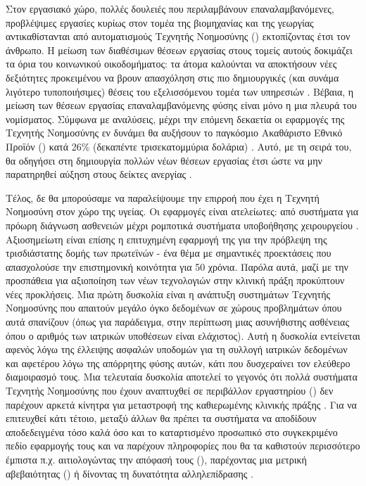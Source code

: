 Στον εργασιακό χώρο, πολλές δουλειές που περιλαμβάνουν επαναλαμβανόμενες, προβλέψιμες εργασίες κυρίως στον τομέα της βιομηχανίας και της γεωργίας αντικαθίστανται από αυτοματισμούς Τεχνητής Νοημοσύνης () εκτοπίζοντας έτσι τον άνθρωπο. 
Η μείωση των διαθέσιμων θέσεων εργασίας στους τομείς αυτούς δοκιμάζει τα όρια του κοινωνικού οικοδομήματος: τα  άτομα καλούνται να αποκτήσουν νέες δεξιότητες προκειμένου να βρουν απασχόληση στις πιο δημιουργικές (και συνάμα λιγότερο τυποποιήσιμες) θέσεις του εξελισσόμενου τομέα των υπηρεσιών \cite{makridakis2017forthcoming}. Βέβαια, η μείωση των θέσεων εργασίας επαναλαμβανόμενης φύσης είναι μόνο η μια πλευρά του νομίσματος. Σύμφωνα με αναλύσεις, μέχρι την επόμενη δεκαετία οι εφαρμογές της Τεχνητής Νοημοσύνης εν δυνάμει θα αυξήσουν το παγκόσμιο Ακαθάριστο Εθνικό Προϊόν () κατά 26\% (δεκαπέντε τρισεκατομμύρια δολάρια) \cite{hawksworth2018will}. Αυτό, με τη σειρά του, θα οδηγήσει στη δημιουργία πολλών νέων θέσεων εργασίας έτσι ώστε να μην παρατηρηθεί αύξηση στους δείκτες ανεργίας \cite{hawksworth2018will,world2020future}.
\par

Τέλος, δε θα μπορούσαμε να παραλείψουμε την επιρροή που έχει η Τεχνητή Νοημοσύνη στον χώρο της υγείας. Οι εφαρμογές είναι ατελείωτες: από συστήματα για πρόωρη διάγνωση ασθενειών μέχρι ρομποτικά συστήματα υποβοήθησης χειρουργείου \cite{tai2020impact}. Αξιοσημείωτη είναι επίσης η επιτυχημένη εφαρμογή της για την πρόβλεψη της τρισδιάστατης δομής των πρωτεϊνών \cite{senior2020improved} - ένα θέμα με σημαντικές προεκτάσεις που απασχολούσε την επιστημονική κοινότητα για 50 χρόνια. Παρόλα αυτά, μαζί με την προσπάθεια για αξιοποίηση των νέων τεχνολογιών στην κλινική πράξη προκύπτουν νέες προκλήσεις. Μια πρώτη δυσκολία είναι η ανάπτυξη συστημάτων Τεχνητής Νοημοσύνης που απαιτούν μεγάλο όγκο δεδομένων σε χώρους προβλημάτων όπου αυτά σπανίζουν (όπως για παράδειγμα, στην περίπτωση μιας ασυνήθιστης ασθένειας όπου ο αριθμός των ιατρικών υποθέσεων είναι ελάχιστος). Αυτή η δυσκολία εντείνεται αφενός λόγω της έλλειψης ασφαλών υποδομών για τη συλλογή ιατρικών δεδομένων \cite{panch2019inconvenient} και αφετέρου λόγω της απόρρητης φύσης αυτών, κάτι που δυσχεραίνει τον ελεύθερο διαμοιρασμό τους. Μια τελευταία δυσκολία αποτελεί το γεγονός ότι πολλά συστήματα Τεχνητής Νοημοσύνης που έχουν αναπτυχθεί σε περιβάλλον εργαστηρίου () δεν παρέχουν αρκετά κίνητρα για μεταστροφή της καθιερωμένης κλινικής πράξης \cite{panch2019inconvenient}. Για να επιτευχθεί κάτι τέτοιο, μεταξύ άλλων θα πρέπει τα συστήματα να αποδίδουν αποδεδειγμένα τόσο καλά όσο και το καταρτισμένο προσωπικό στο συγκεκριμένο πεδίο εφαρμογής τους και να παρέχουν πληροφορίες που θα τα καθιστούν περισσότερο έμπιστα π.χ. αιτιολογώντας την απόφασή τους (),  παρέχοντας μια μετρική αβεβαιότητας () ή δίνοντας τη δυνατότητα αλληλεπίδρασης \cite{rajkomar2019machine}.
\par

